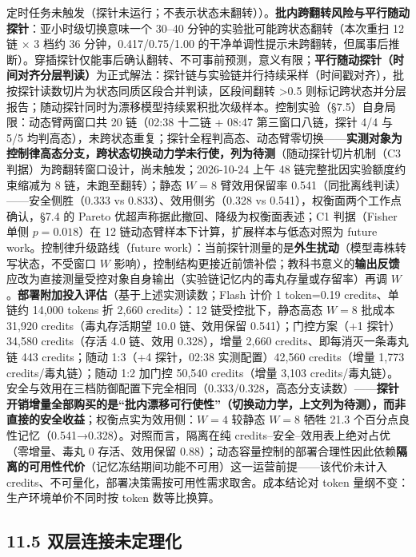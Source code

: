 \documentclass[
]{ctexart}
\begin{document}
定时任务未触发（探针未运行；不表示状态未翻转））。\textbf{批内跨翻转风险与平行随动探针}：亚小时级切换意味一个
30--40 分钟的实验批可能跨状态翻转（本次重扫 12 链 × 3 档约 36
分钟，0.417/0.75/1.00
的干净单调性提示未跨翻转，但属事后推断）。穿插探针仅能事后确认翻转、不可事前预测，意义有限；\textbf{平行随动探针（时间对齐分层判读）}为正式解法：探针链与实验链并行持续采样（时间戳对齐），批按探针读数切片为状态同质区段合并判读，区段间翻转
\textgreater0.5
则标记跨状态并分层报告；随动探针同时为漂移模型持续累积批次级样本。控制实验（§7.5）自身局限：动态臂两窗口共
20 链（02:38 十二链 + 08:47 第三窗口八链，探针 4/4 与 5/5
均判高态），未跨状态重复；探针全程判高态、动态臂零切换------\textbf{实测对象为控制律高态分支，跨状态切换动力学未行使，列为待测}（随动探针切片机制（C3
判据）为跨翻转窗口设计，尚未触发；2026-10-24 上午 48
链完整批因实验额度约束缩减为 8 链，未跑至翻转）；静态 \(W{=}8\)
臂效用保留率 0.541（同批离线判读）------安全侧胜（0.333 vs
0.833）、效用侧劣（0.328 vs 0.541），权衡面两个工作点确认，§7.4 的
Pareto 优超声称据此撤回、降级为权衡面表述；C1 判据（Fisher 单侧
\(p{=}0.018\)）在 12 链动态臂样本下计算，扩展样本与低态对照为 future
work。控制律升级路线（future
work）：当前探针测量的是\textbf{外生扰动}（模型毒株转写状态，不受窗口
\(W\)
影响），控制结构更接近前馈补偿；教科书意义的\textbf{输出反馈}应改为直接测量受控对象自身输出（实验链记忆内的毒丸存量或存留率）再调
\(W\)。\textbf{部署附加投入评估}（基于上述实测读数；Flash 计价 1
token=0.19 credits、单链约 14,000 tokens 折 2,660 credits）：12
链受控批下，静态高态 \(W{=}8\) 批成本 31,920 credits（毒丸存活期望 10.0
链、效用保留 0.541）；门控方案（+1 探针）34,580 credits（存活 4.0
链、效用 0.328），增量 2,660 credits、即每消灭一条毒丸链 443
credits；随动 1:3（+4 探针，02:38 实测配置）42,560 credits（增量 1,773
credits/毒丸链）；随动 1:2 加门控 50,540 credits（增量 3,103
credits/毒丸链）。安全与效用在三档防御配置下完全相同（0.333/0.328，高态分支读数）------\textbf{探针开销增量全部购买的是``批内漂移可行使性''（切换动力学，上文列为待测），而非直接的安全收益}；权衡点实为效用侧：\(W{=}4\)
较静态 \(W{=}8\) 牺牲 21.3
个百分点良性记忆（0.541→0.328）。对照而言，隔离在纯
credits--安全--效用表上绝对占优（零增量、毒丸 0 存活、效用保留
0.88）；动态容量控制的部署合理性因此依赖\textbf{隔离的可用性代价}（记忆冻结期间功能不可用）这一运营前提------该代价未计入
credits、不可量化，部署决策需按可用性需求取舍。成本结论对 token
量纲不变：生产环境单价不同时按 token 数等比换算。

\subsection{11.5
双层连接未定理化}\label{ux53ccux5c42ux8fdeux63a5ux672aux5b9aux7406ux5316}
\end{document}
